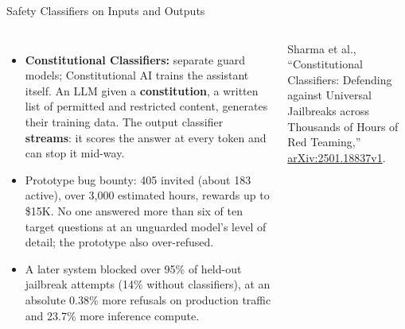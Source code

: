 \begin{frame}{Safety Classifiers on Inputs and Outputs}
\begin{columns}[T,onlytextwidth]
\begin{itemize}
        \item[\textcolor{red}{$\blacktriangleright$}] \textbf{Constitutional Classifiers:} separate guard models; Constitutional AI trains the assistant itself. An LLM given a \textbf{constitution}, a written list of permitted and restricted content, generates their training data. The output classifier \textbf{streams}: it scores the answer at every token and can stop it mid-way.
        \item[\textcolor{red}{$\blacktriangleright$}] Prototype bug bounty: 405 invited (about 183 active), over 3{,}000 estimated hours, rewards up to \$15K. No one answered more than six of ten target questions at an unguarded model's level of detail; the prototype also over-refused.
        \item[\textcolor{red}{$\blacktriangleright$}] A later system blocked over 95\% of held-out jailbreak attempts (14\% without classifiers), at an absolute 0.38\% more refusals on production traffic and 23.7\% more inference compute.
      \end{itemize}
      \vspace{0.1em}
      {\scriptsize Sharma et al., ``Constitutional Classifiers: Defending against Universal Jailbreaks across Thousands of Hours of Red Teaming,'' \href{https://arxiv.org/abs/2501.18837v1}{arXiv:2501.18837v1}.\par}
  \end{columns}
\end{frame}

